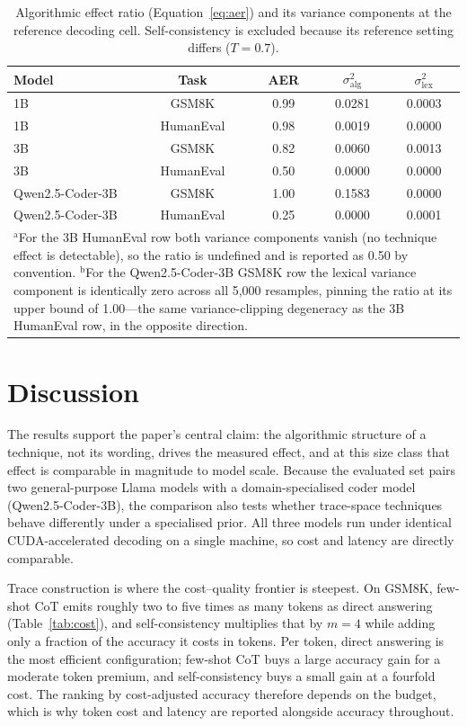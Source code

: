 \documentclass[conference]{IEEEtran}
\begin{document}
\begin{table}[htbp]
\caption{Algorithmic effect ratio (Equation~\eqref{eq:aer}) and its
variance components at the reference decoding cell.  Self-consistency
is excluded because its reference setting differs ($T = 0.7$).}
\centering
\footnotesize
\begin{tabular}{lcccc}
\toprule
\textbf{Model} & \textbf{Task} & \textbf{AER} & $\sigma^{2}_{\mathrm{alg}}$ & $\sigma^{2}_{\mathrm{lex}}$ \\
\midrule
1B & GSM8K & 0.99 & 0.0281 & 0.0003 \\
1B & HumanEval & 0.98 & 0.0019 & 0.0000 \\
3B & GSM8K & 0.82 & 0.0060 & 0.0013 \\
3B & HumanEval & 0.50 & 0.0000 & 0.0000 \\
Qwen2.5-Coder-3B & GSM8K & 1.00 & 0.1583 & 0.0000 \\
Qwen2.5-Coder-3B & HumanEval & 0.25 & 0.0000 & 0.0001 \\
\bottomrule
\multicolumn{5}{p{\dimexpr\columnwidth-12pt\relax}}{$^{\mathrm{a}}$For the 3B HumanEval row both variance
components vanish (no technique effect is detectable), so the ratio is
undefined and is reported as 0.50 by convention.
$^{\mathrm{b}}$For the Qwen2.5-Coder-3B GSM8K row the lexical
variance component is identically zero across all 5,000 resamples,
pinning the ratio at its upper bound of 1.00---the same
variance-clipping degeneracy as the 3B HumanEval row, in the opposite
direction.}
\end{tabular}
\label{tab:aer}
\end{table}

\section{Discussion}
\label{sec:discussion}

The results support the paper's central claim: the algorithmic
structure of a technique, not its wording, drives the measured
effect, and at this size class that effect is comparable in magnitude
to model scale.  Because the evaluated set pairs two general-purpose
Llama models with a domain-specialised coder model
(Qwen2.5-Coder-3B), the comparison also tests whether trace-space
techniques behave differently under a specialised prior.  All three
models run under identical CUDA-accelerated decoding on a single
machine, so cost and latency are directly comparable.

Trace construction is where the cost--quality frontier is steepest.
On GSM8K, few-shot CoT emits roughly two to five times as many tokens
as direct answering (Table~\ref{tab:cost}), and self-consistency
multiplies that by $m = 4$ while adding only a fraction of the
accuracy it costs in tokens.  Per token, direct answering is the
most efficient configuration; few-shot CoT buys a large accuracy
gain for a moderate token premium, and self-consistency buys a small
gain at a fourfold cost.  The ranking by cost-adjusted accuracy
therefore depends on the budget, which is why token cost and latency
are reported alongside accuracy throughout.
\end{document}
